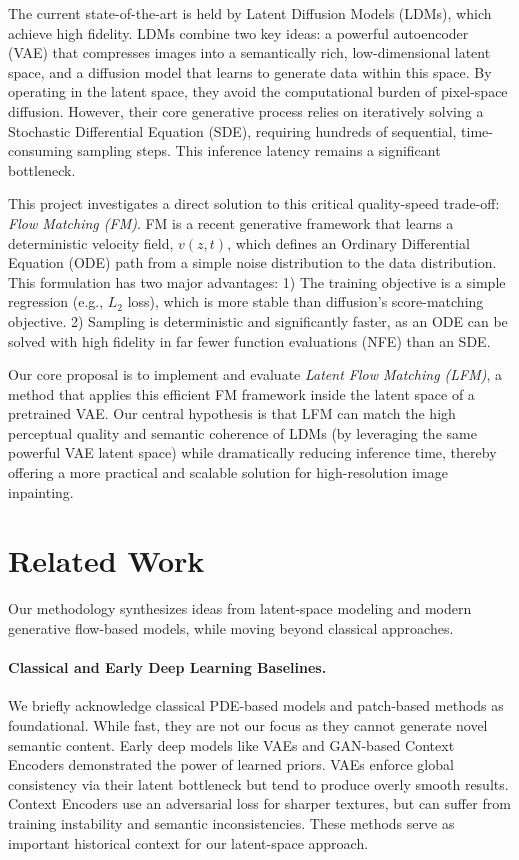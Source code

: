 \documentclass{article}
\begin{document}
The current state-of-the-art is held by Latent Diffusion Models (LDMs), which achieve high fidelity. LDMs combine two key ideas: a powerful autoencoder (VAE) that compresses images into a semantically rich, low-dimensional latent space, and a diffusion model that learns to generate data within this space. By operating in the latent space, they avoid the computational burden of pixel-space diffusion. However, their core generative process relies on iteratively solving a Stochastic Differential Equation (SDE), requiring hundreds of sequential, time-consuming sampling steps. This inference latency remains a significant bottleneck.

This project investigates a direct solution to this critical quality-speed trade-off: \emph{Flow Matching (FM)}. FM is a recent generative framework that learns a deterministic velocity field, $v(z,t)$, which defines an Ordinary Differential Equation (ODE) path from a simple noise distribution to the data distribution. This formulation has two major advantages: 1) The training objective is a simple regression (e.g., $L_2$ loss), which is more stable than diffusion's score-matching objective. 2) Sampling is deterministic and significantly faster, as an ODE can be solved with high fidelity in far fewer function evaluations (NFE) than an SDE.

Our core proposal is to implement and evaluate \emph{Latent Flow Matching (LFM)}, a method that applies this efficient FM framework inside the latent space of a pretrained VAE. Our central hypothesis is that LFM can match the high perceptual quality and semantic coherence of LDMs (by leveraging the same powerful VAE latent space) while dramatically reducing inference time, thereby offering a more practical and scalable solution for high-resolution image inpainting.

\section{Related Work}

Our methodology synthesizes ideas from latent-space modeling and modern generative flow-based models, while moving beyond classical approaches.

\paragraph{Classical and Early Deep Learning Baselines.}
We briefly acknowledge classical PDE-based models and patch-based methods as foundational. While fast, they are not our focus as they cannot generate novel semantic content. Early deep models like VAEs and GAN-based Context Encoders demonstrated the power of learned priors. VAEs enforce global consistency via their latent bottleneck but tend to produce overly smooth results. Context Encoders use an adversarial loss for sharper textures, but can suffer from training instability and semantic inconsistencies. These methods serve as important historical context for our latent-space approach.
\end{document}
